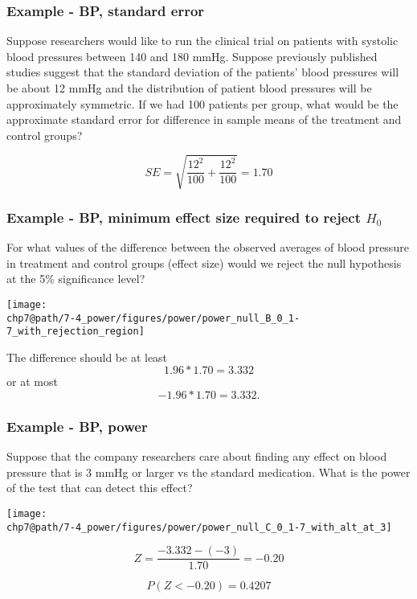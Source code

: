 \documentclass[slidestop,compress,mathserif]{beamer}
\makeatletter
\newcommand{\soln}[1]{\textit{#1}}
\def\chp7@path{../../Chp 7}
\makeatother
\begin{document}

\begin{frame}
\frametitle{Example - BP, standard error}

{\dq
{\footnotesize
Suppose researchers would like to run the clinical trial on patients with systolic blood pressures between 140 and 180 mmHg. Suppose previously published studies suggest that the standard deviation of the patients' blood pressures will be about 12 mmHg and the distribution of patient blood pressures will be approximately symmetric. If we had 100 patients per group, what would be the approximate standard error for difference in sample means of the treatment and control groups?
}
}

\pause

\soln{
\[ SE = \sqrt{ \frac{12^2}{100} + \frac{12^2}{100} } = 1.70 \]
}

\end{frame}


\begin{frame}
\frametitle{Example - BP, minimum effect size required to reject $H_0$}

{\dq
{\footnotesize
For what values of the difference between the observed averages of blood pressure in treatment and control groups (effect size) would we reject the null hypothesis at the 5\% significance level?}
}

\pause

\texttt{[image: \\chp7@path/7-4\_power/figures/power/power\_null\_B\_0\_1-7\_with\_rejection\_region]}

\pause

The difference should be at least 
\[ 1.96 * 1.70 = 3.332 \] 
or at most 
\[ -1.96 * 1.70 = 3.332. \]

\end{frame}


\begin{frame}
\frametitle{Example - BP, power}

{\dq
{\footnotesize
Suppose that the company researchers care about finding any effect on blood pressure that is 3 mmHg or larger vs the standard medication. What is the power of the test that can detect this effect?
}}

\pause

\texttt{[image: \\chp7@path/7-4\_power/figures/power/power\_null\_C\_0\_1-7\_with\_alt\_at\_3]}

\pause

\[ Z = \frac{-3.332 - (-3)}{1.70} = -0.20 \]

\pause

\[ P(Z < -0.20) = 0.4207 \]

\end{frame}
\end{document}
